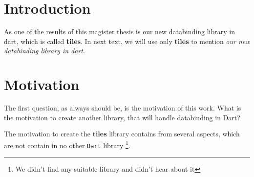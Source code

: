 \documentclass[oneside, 12pt]{book}
\begin{document}
\chapter*{Introduction}\label{chap:intro}

As one of the results of this magister thesis is our new databinding library in dart, 
which is called \textbf{tiles}. 
In next  text, we will use only \textbf{tiles} to mention \textit{our new databinding library in dart}.


\pagestyle{headings}
\chapter{Motivation}\label{chap:motivation}

The first question, as always should be, is the motivation of this work. 
What is the motivation to create another library, that will handle databinding in Dart?

The motivation to create the \textbf{tiles} library contains from several aspects, 
which are not contain in no other \texttt{Dart} library
\footnote{We didn't find any suitable library and didn't hear about it}.
\end{document}
